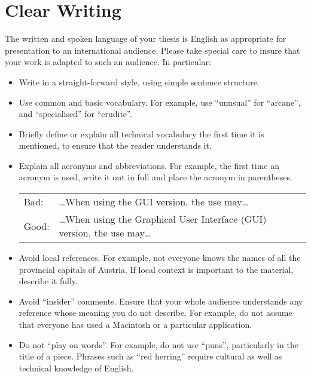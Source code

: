 \section{Clear Writing}
\label{sec:Clear}

The written and spoken language of your thesis is English as
appropriate for presentation to an international audience. Please take
special care to insure that your work is adapted to such an audience.
In particular:

\begin{itemize}
\item Write in a straight-forward style, using simple sentence
  structure.

\item Use common and basic vocabulary. For example, use ``unusual''
  for ``arcane'', and ``specialised'' for ``erudite''.

\item Briefly define or explain all technical vocabulary the first
  time it is mentioned, to ensure that the reader understands it.

\item Explain all acronyms and abbreviations. For example, the first
  time an acronym is used, write it out in full and place the acronym
  in parentheses.

\begin{tabular}{lp{0.9\hsize}}
Bad:  & \ldots When using the GUI version, the use may\ldots  \\
Good: & \ldots When using the Graphical User Interface (GUI) version, the use may\ldots  \\
\end{tabular}


\item Avoid local references. For example, not everyone knows the
  names of all the provincial capitals of Austria. If local context is
  important to the material, describe it fully.

\item Avoid ``insider'' comments. Ensure that your whole audience
  understands any reference whose meaning you do not describe. For
  example, do not assume that everyone has used a Macintosh or a
  particular application.

\item Do not ``play on words''. For example, do not use ``puns'',
  particularly in the title of a piece. Phrases such as ``red
  herring'' require cultural as well as technical knowledge of
  English.


\end{itemize}
